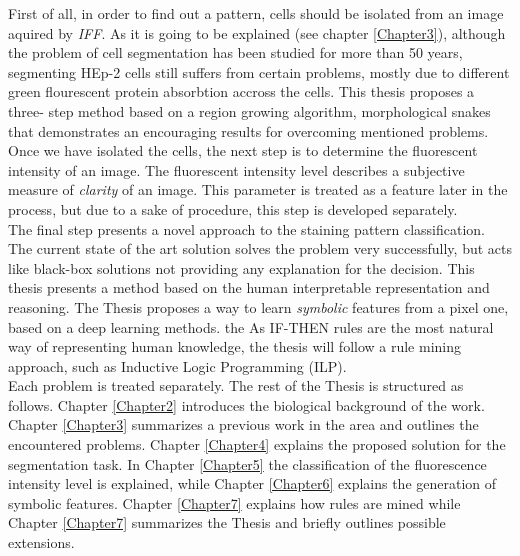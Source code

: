 First of all, in order to find out a  pattern, cells should be isolated from an image aquired by \textit{IFF}. As it is going to be explained (see chapter \ref{Chapter3}), although the problem of cell segmentation has been studied for more than 50 years, segmenting HEp-2 cells still suffers from certain problems, mostly due to different green flourescent protein absorbtion accross the cells. This thesis proposes a three- step method based on a region growing algorithm, morphological snakes  that demonstrates an encouraging results for overcoming mentioned problems. \\

Once we have isolated the cells, the next step is to determine the fluorescent intensity of an image. The fluorescent intensity level describes a subjective measure of \textit{clarity} of an image. This parameter is treated as a feature later in the process, but due to a sake of procedure, this step is developed separately. \\ 

The final step presents a novel approach to the staining pattern classification. The current state of the art solution solves the problem very successfully, but acts like  black-box solutions not providing any explanation for the decision. This thesis presents a method based on the human interpretable representation and reasoning. The Thesis proposes a way to learn \textit{symbolic} features from a pixel one, based on a deep learning methods. the As IF-THEN rules are the most natural way of representing human knowledge,  the thesis will follow a rule mining approach, such as Inductive Logic Programming (ILP).  \\

Each problem is treated separately. The rest of the Thesis is structured as follows. Chapter \ref{Chapter2} introduces the biological background of the work. Chapter \ref{Chapter3} summarizes a previous work in the area and outlines the encountered problems. Chapter \ref{Chapter4} explains the proposed solution for the segmentation task. In Chapter \ref{Chapter5} the classification of the fluorescence intensity level is explained, while Chapter \ref{Chapter6} explains the generation of symbolic features. Chapter \ref{Chapter7} explains how rules are mined while Chapter \ref{Chapter7} summarizes the Thesis and briefly outlines possible extensions.